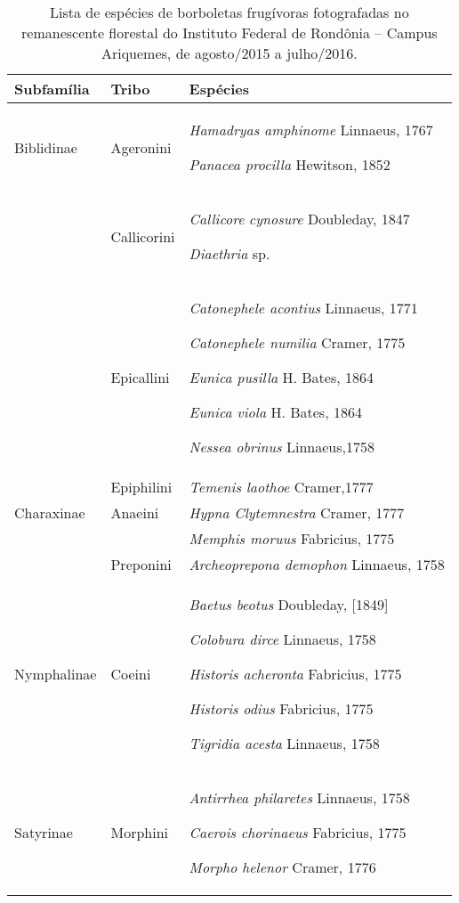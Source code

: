\documentclass[article,12pt,onesidea,4paper,english,brazil]{abntex2}
\begin{document}
	\captionsetup{width=170mm}
	\begin{longtable}{p{.2\linewidth}p{.2\linewidth}p{.5\linewidth}}
		\caption{Lista de espécies de borboletas frugívoras fotografadas no remanescente florestal do Instituto Federal de Rondônia – Campus Ariquemes, de agosto/2015 a julho/2016.}
		\label{my-label} \\
		\hline 
		\textbf{Subfamília} &
		\textbf{Tribo} &
		\textbf{Espécies}
		\\  
		\hline
		Biblidinae &
		Ageronini &
			\textit{Hamadryas amphinome }Linnaeus, 1767
			
			\textit{Panacea procilla }Hewitson, 1852  			
		\\  
		 &
		Callicorini &
			\textit{Callicore }\textit{cynosure }Doubleday, 1847
		
			\textit{Diaethria }sp.  			
		\\  
		 &
		Epicallini &
		\textit{Catonephele acontius }Linnaeus, 1771
		
		\textit{Catonephele numilia }Cramer, 1775  			
			
			\textit{Eunica pusilla }H. Bates, 1864  			
			
			\textit{Eunica viola }H. Bates, 1864
			
			\textit{Nessea obrinus }Linnaeus,1758 
		\\  
		& Epiphilini & \textit{Temenis laothoe }Cramer,1777 \\
		Charaxinae &
		Anaeini &
		\textit{Hypna Clytemnestra }Cramer, 1777
		\\  
		 & & \textit{Memphis moruus }Fabricius, 1775 \\  
		& Preponini & \textit{Archeoprepona demophon }Linnaeus, 1758 \\
		
		Nymphalinae &
		Coeini &
		\textit{Baetus beotus }Doubleday, [1849]  			
			
			\textit{Colobura dirce }Linnaeus, 1758  			
			
			\textit{Historis acheronta }Fabricius, 1775  			
			
			\textit{Historis odius }Fabricius, 1775
			
			\textit{Tigridia acesta }Linnaeus, 1758 
		\\  
		Satyrinae &
			Morphini &
			\textit{Antirrhea philaretes }Linnaeus, 1758  			
			
			\textit{Caerois chorinaeus }Fabricius, 1775  			
			
			\textit{Morpho helenor }Cramer, 1776  			
			

\end{longtable}
\end{document}
